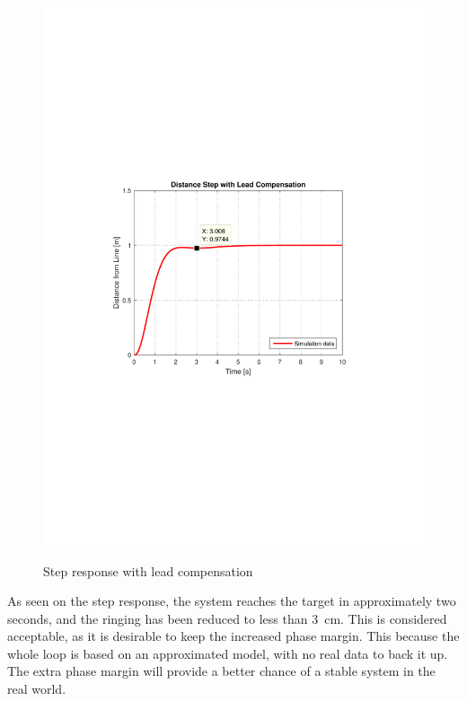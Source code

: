 \begin{figure}[H]
  \centering
  {
    \includegraphics[width=1.4\textwidth]{figures/distanceStep3.pdf}
  }
  \caption{Step response with lead compensation}
  \label{SimulationSteeringP3}
\end{figure}
As seen on the step response, the system reaches the target in approximately two seconds, and the ringing has been reduced to less than \SI{3}{cm}. This is considered acceptable, as it is desirable to keep the increased phase margin. This because the whole loop is based on an approximated model, with no real data to back it up. The extra phase margin will provide a better chance of a stable system in the real world.